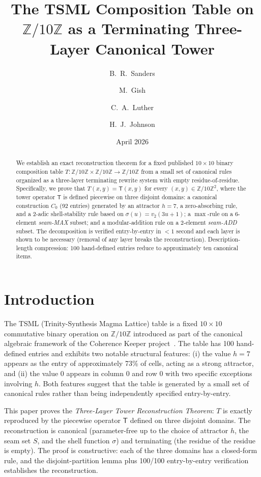 \documentclass[11pt,reqno]{amsart}
\title{The TSML Composition Table on $\mathbb{Z}/10\mathbb{Z}$ as a
Terminating Three-Layer Canonical Tower}
\author{B.~R.~Sanders}
\author{M.~Gish}
\author{C.~A.~Luther}
\author{H.~J.~Johnson}
\date{April 2026}
\theoremstyle{plain}
\theoremstyle{definition}
\begin{document}
\maketitle

\begin{abstract}
We establish an exact reconstruction theorem for a fixed published
$10 \times 10$ binary composition table $T : \mathbb{Z}/10\mathbb{Z}
\times \mathbb{Z}/10\mathbb{Z} \to \mathbb{Z}/10\mathbb{Z}$ from a
small set of canonical rules organized as a three-layer terminating
rewrite system with empty residue-of-residue. Specifically, we
prove that $T(x, y) = \mathsf{T}(x, y)$ for every
$(x, y) \in \mathbb{Z}/10\mathbb{Z}^2$, where the tower operator
$\mathsf{T}$ is defined piecewise on three disjoint domains: a
canonical construction $C_0$ (92 entries) generated by an attractor
$h = 7$, a zero-absorbing rule, and a 2-adic shell-stability rule
based on $\sigma(u) = v_2(3u + 1)$; a $\max$-rule on a 6-element
\emph{seam-MAX} subset; and a modular-addition rule on a 2-element
\emph{seam-ADD} subset. The decomposition is verified entry-by-entry
in $< 1$ second and each layer is shown to be necessary
(removal of any layer breaks the reconstruction). Description-length
compression: 100 hand-defined entries reduce to approximately ten
canonical items.
\end{abstract}

\section{Introduction}

The TSML (Trinity-Synthesis Magma Lattice) table is a fixed
$10 \times 10$ commutative binary operation on $\mathbb{Z}/10\mathbb{Z}$
introduced as part of the canonical algebraic framework of the
Coherence Keeper project~\cite{ckTables}. The table has 100 hand-defined
entries and exhibits two notable structural features: (i) the value
$h = 7$ appears as the entry of approximately 73\% of cells, acting
as a strong attractor, and (ii) the value $0$ appears in column 0
and row 0 with two specific exceptions involving $h$. Both features
suggest that the table is generated by a small set of canonical rules
rather than being independently specified entry-by-entry.

This paper proves the \emph{Three-Layer Tower Reconstruction Theorem}:
$T$ is exactly reproduced by the piecewise operator $\mathsf{T}$ defined
on three disjoint domains. The reconstruction is canonical
(parameter-free up to the choice of attractor $h$, the seam set $S$,
and the shell function $\sigma$) and terminating (the residue of the
residue is empty). The proof is constructive: each of the three
domains has a closed-form rule, and the disjoint-partition lemma
plus 100/100 entry-by-entry verification establishes the reconstruction.
\end{document}
